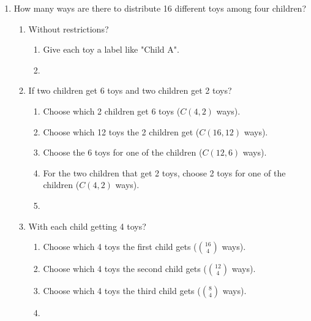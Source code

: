 \documentclass[12pt]{amsart}
\begin{document}
\begin{enumerate}
\item How many ways are there to distribute 16 different toys among four children?
    \begin{enumerate}
    \item Without restrictions?
        \begin{enumerate}
            \item Give each toy a label like "Child A".
            \item {}
        \end{enumerate}
    \item If two children get 6 toys and two children get 2 toys?
        \begin{enumerate}
            \item Choose which 2 children get 6 toys ($C(4,2)$ ways).
            \item Choose which 12 toys the 2 children get ($C(16,12)$ ways).
            \item Choose the 6 toys for one of the children ($C(12,6)$ ways).
            \item For the two children that get 2 toys, choose 2 toys for one of the children ($C(4,2)$ ways).
            \item {}
        \end{enumerate}
    \item  With each child getting 4 toys?
        \begin{enumerate}
            \item Choose which 4 toys the first child gets ($\binom{16}{4}$ ways).
            \item Choose which 4 toys the second child gets ($\binom{12}{4}$ ways).
            \item Choose which 4 toys the third child gets ($\binom{8}{4}$ ways).
            \item {}
        \end{enumerate}
    \end{enumerate}



\end{enumerate}
\end{document}
